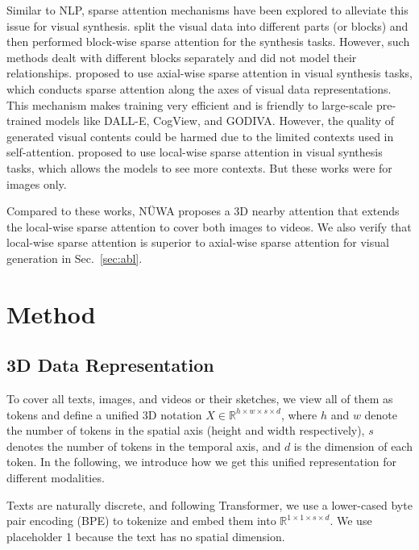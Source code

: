 Similar to NLP, sparse attention mechanisms have been explored to alleviate this issue for visual synthesis.
\cite{weissenbornScalingAutoregressiveVideo2020, rakhimovLatentVideoTransformer2020} split the visual data into different parts (or blocks) and then performed block-wise sparse attention for the synthesis tasks. However, such methods dealt with different blocks separately and did not model their relationships.
\cite{hoAxialAttentionMultidimensional2019, rameshZeroShotTexttoImageGeneration2021, wuGODIVAGeneratingOpenDomaIn2021} proposed to use axial-wise sparse attention in visual synthesis tasks, which conducts sparse attention along the axes of visual data representations. This mechanism makes training very efficient and is friendly to large-scale pre-trained models like DALL-E\cite{rameshZeroShotTexttoImageGeneration2021}, CogView\cite{dingCogViewMasteringTexttoImage2021}, and GODIVA\cite{wuGODIVAGeneratingOpenDomaIn2021}. However, the quality of generated visual contents could be harmed due to the limited contexts used in self-attention.
\cite{parmarImageTransformer2018, ramachandranStandaloneSelfattentionVision2019, childGeneratingLongSequences2019} proposed to use local-wise sparse attention in visual synthesis tasks, which allows the models to see more contexts. But these works were for images only.

Compared to these works, NÜWA proposes a 3D nearby attention that extends the local-wise sparse attention to cover both images to videos. We also verify that local-wise sparse attention is superior to axial-wise sparse attention for visual generation in Sec.~\ref{sec:abl}.

\section{Method}
\subsection{3D Data Representation} \label{sec:rep}
To cover all texts, images, and videos or their sketches, we view all of them as tokens and define a unified 3D notation $X\in \mathbb{R}^{h\times w \times s\times d}$, where $h$ and $w$ denote the number of tokens in the spatial axis (height and width respectively), $s$ denotes the number of tokens in the temporal axis, and $d$ is the dimension of each token. In the following, we introduce how we get this unified representation for different modalities.

Texts are naturally discrete, and following Transformer\cite{vaswaniAttentionAllYou2017}, we use a lower-cased byte pair encoding (BPE) to tokenize and embed them into $\mathbb{R}^{1\times 1\times s\times d}$. We use placeholder 1 because the text has no spatial dimension.

